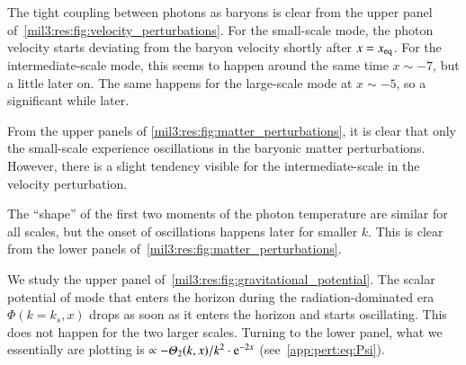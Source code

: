 





The tight coupling between photons as baryons is clear from the upper panel of~\cref{mil3:res:fig:velocity_perturbations}. For the small-scale mode, the photon velocity starts deviating from the baryon velocity shortly after $x=x_\mathrm{eq}$. For the intermediate-scale mode, this seems to happen around the same time $x\sim-7$, but a little later on. The same happens for the large-scale mode at $x\sim -5$, so a significant while later.

From the upper panels of \cref{mil3:res:fig:matter_perturbations}, it is clear that only the small-scale experience oscillations in the baryonic matter perturbations. However, there is a slight tendency visible for the intermediate-scale in the velocity perturbation.

The ``shape'' of the first two moments of the photon temperature are similar for all scales, but the onset of oscillations happens later for smaller $k$. This is clear from the lower panels of~\cref{mil3:res:fig:matter_perturbations}.

We study the upper panel of~\cref{mil3:res:fig:gravitational_potential}. The scalar potential of mode that enters the horizon during the radiation-dominated era $\Phi(k\!=\!k_s,x)$ drops as soon as it enters the horizon and starts oscillating. This does not happen for the two larger scales. Turning to the lower panel, what we essentially are plotting is $\propto -\Theta_2(k,x)/k^2\cdot \eu[-2x]$ (see~\cref{app:pert:eq:Psi}).



